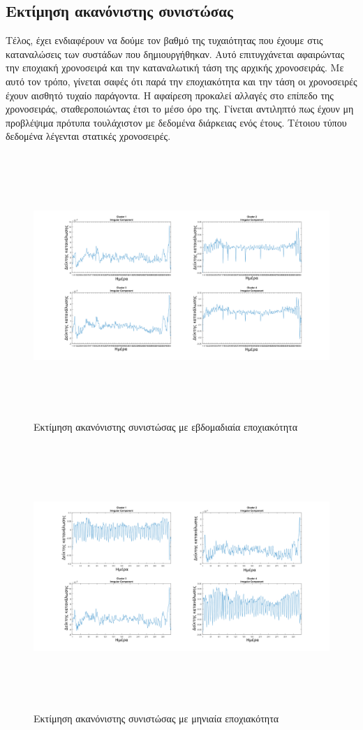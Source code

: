 \subsection{Εκτίμηση ακανόνιστης συνιστώσας}
Τέλος, έχει ενδιαφέρουν να δούμε τον βαθμό της τυχαιότητας που έχουμε στις καταναλώσεις των συστάδων που δημιουργήθηκαν. Αυτό επιτυγχάνεται αφαιρώντας την εποχιακή χρονοσειρά και την καταναλωτική τάση της αρχικής χρονοσειράς. Με αυτό τον τρόπο, γίνεται σαφές ότι παρά την εποχιακότητα και την τάση οι χρονοσειρές έχουν αισθητό τυχαίο παράγοντα. Η αφαίρεση προκαλεί αλλαγές στο επίπεδο της χρονοσειράς, σταθεροποιώντας έτσι το μέσο όρο της. Γίνεται αντιληπτό πως έχουν μη προβλέψιμα πρότυπα  τουλάχιστον με δεδομένα διάρκειας ενός έτους. Τέτοιου τύπου δεδομένα λέγενται στατικές χρονοσειρές.\cite{stationarity}
\begin{figure}[ht!]
\centering
\includegraphics[width=180mm, height=100mm]{../../plots/Trend_estimation/Irregular_component_ALL.png}
\caption{Εκτίμηση ακανόνιστης συνιστώσας με εβδομαδιαία εποχιακότητα}
\label{fig:irregular week}
\end{figure}

\newpage
\begin{figure}[ht!]
\centering
\includegraphics[width=180mm, height=100mm]{../../plots/Trend_estimation/Irregular_component_month_ALL.png}
\caption{Εκτίμηση ακανόνιστης συνιστώσας με μηνιαία εποχιακότητα}
\label{fig:irregular month}
\end{figure}
